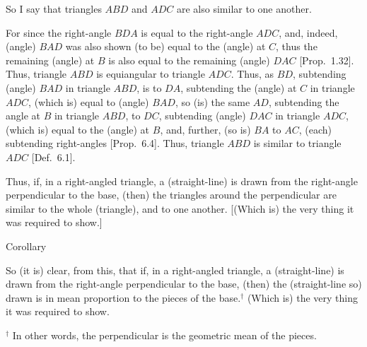 \begin{Parallel}{}{}
{ So I say that triangles $ABD$ and $ADC$ are also similar to one another.
 
 For since the right-angle $BDA$ is equal to the right-angle $ADC$, and, indeed,
 (angle) $BAD$ was also shown (to be) equal to the (angle) at $C$, thus the
 remaining (angle) at $B$ is also equal to the remaining (angle) $DAC$ 
 [Prop.~1.32].
  Thus, triangle $ABD$ is equiangular to triangle $ADC$.
 Thus, as $BD$, subtending (angle) $BAD$ in triangle $ABD$, is to
 $DA$, subtending the (angle) at $C$ in triangle $ADC$, (which is) equal to (angle) $BAD$, so (is) the
 same $AD$, subtending the angle at $B$ in triangle $ABD$, to $DC$, subtending
 (angle) $DAC$ in triangle $ADC$, (which is) equal to the (angle) at $B$,
 and, further, (so is) $BA$ to $AC$, (each) subtending  right-angles [Prop.~6.4]. Thus, triangle $ABD$ is similar to
 triangle $ADC$  [Def.~6.1].
 
 Thus,  if, in a right-angled triangle, a (straight-line) is drawn from the right-angle perpendicular
to the base,  (then) the triangles around the perpendicular are similar to
the whole (triangle), and to one another. [(Which is) the very thing it
was required to show.]\\

\begin{center}
{\large Corollary}
\end{center}\vspace*{-7pt}

So (it is) clear, from this, that if, in a right-angled triangle, a
(straight-line) is drawn from the right-angle perpendicular to the base, (then) the (straight-line so)
drawn is in mean proportion to the pieces of the base.$^\dag$ (Which
is) the very thing it was required to show.}
\end{Parallel}
{\footnotesize \noindent$^\dag$ In other words, the perpendicular is the geometric mean of the pieces.} 

